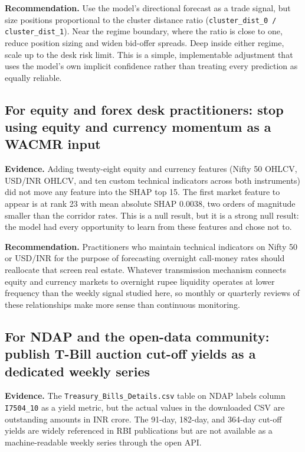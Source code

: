 \textbf{Recommendation.} Use the model's directional forecast as a
trade signal, but size positions proportional to the cluster
distance ratio (\texttt{cluster\_dist\_0 / cluster\_dist\_1}). Near
the regime boundary, where the ratio is close to one, reduce
position sizing and widen bid-offer spreads. Deep inside either
regime, scale up to the desk risk limit. This is a simple,
implementable adjustment that uses the model's own implicit
confidence rather than treating every prediction as equally reliable.

\subsection{For equity and forex desk practitioners: stop using
equity and currency momentum as a WACMR input}

\textbf{Evidence.} Adding twenty-eight equity and currency features
(Nifty 50 OHLCV, USD/INR OHLCV, and ten custom technical indicators
across both instruments) did not move any feature into the SHAP top
15. The first market feature to appear is at rank 23 with mean
absolute SHAP 0.0038, two orders of magnitude smaller than the
corridor rates. This is a null result, but it is a strong null
result: the model had every opportunity to learn from these features
and chose not to.

\textbf{Recommendation.} Practitioners who maintain technical
indicators on Nifty 50 or USD/INR for the purpose of forecasting
overnight call-money rates should reallocate that screen real estate.
Whatever transmission mechanism connects equity and currency markets
to overnight rupee liquidity operates at lower frequency than the
weekly signal studied here, so monthly or quarterly reviews of these
relationships make more sense than continuous monitoring.

\subsection{For NDAP and the open-data community: publish T-Bill
auction cut-off yields as a dedicated weekly series}

\textbf{Evidence.} The \texttt{Treasury\_Bills\_Details.csv} table on
NDAP labels column \texttt{I7504\_10} as a yield metric, but the
actual values in the downloaded CSV are outstanding amounts in INR
crore. The 91-day, 182-day, and 364-day cut-off yields are widely
referenced in RBI publications but are not available as a
machine-readable weekly series through the open API.

